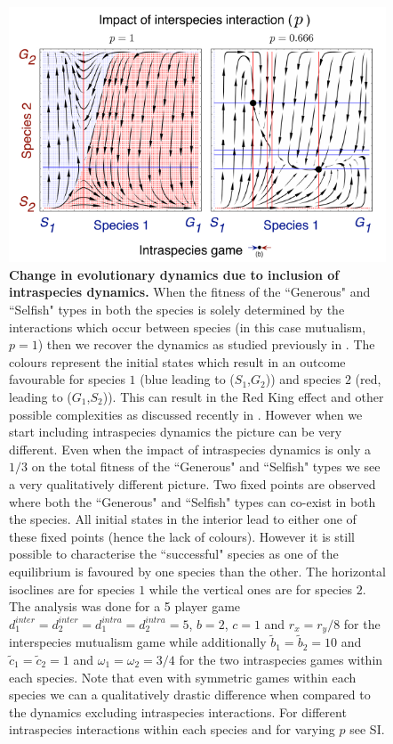 \documentclass[12pt]{article}
\begin{document}
\begin{figure}
\begin{center}
\includegraphics[width=\columnwidth]{Figures/mainexample2.pdf}
\caption{\small{
\textbf{Change in evolutionary dynamics due to inclusion of intraspecies dynamics.} When the fitness of the ``Generous" and ``Selfish" types in both the species is solely determined by the interactions which occur between species (in this case mutualism, $p=1$) then we recover the dynamics as studied previously in \citep{gokhale:PRSB:2012}. The colours represent the initial states which result in an outcome favourable for species $1$ (blue leading to ($S_1$,$G_2$)) and species $2$ (red, leading to ($G_1$,$S_2$)). This can result in the Red King effect and other possible complexities as discussed recently in \citep{gao:SciRep:2015}. However when we start including intraspecies dynamics the picture can be very different.
Even when the impact of intraspecies dynamics is only a $1/3$ on the total fitness of the ``Generous" and ``Selfish" types we see a very qualitatively different picture.
Two fixed points are observed where both the ``Generous" and ``Selfish" types can co-exist in both the species.
All initial states in the interior lead to either one of these fixed points (hence the lack of colours).
However it is still possible to characterise the ``successful" species as one of the equilibrium is favoured by one species than the other.
The horizontal isoclines are for species $1$ while the vertical ones are for species $2$.
The analysis was done for a 5 player game $d_1^{inter} = d_2^{inter} = d_1^{intra} = d_2^{intra} = 5$, $b=2$, $c=1$ and $r_x = r_y /8$ for the interspecies mutualism game while additionally $\tilde{b}_1 = \tilde{b}_2 = 10$ and $\tilde{c}_1 = \tilde{c}_2 = 1$ and $\omega_1 = \omega_2 = 3/4$ for the two intraspecies games within each species. Note that even with symmetric games within each species we can a qualitatively drastic difference when compared to the dynamics excluding intraspecies interactions.  For different intraspecies interactions within each species and for varying $p$ see SI.}
\label{fig:mainexampleone}
}
\end{center}
\end{figure}
\end{document}
